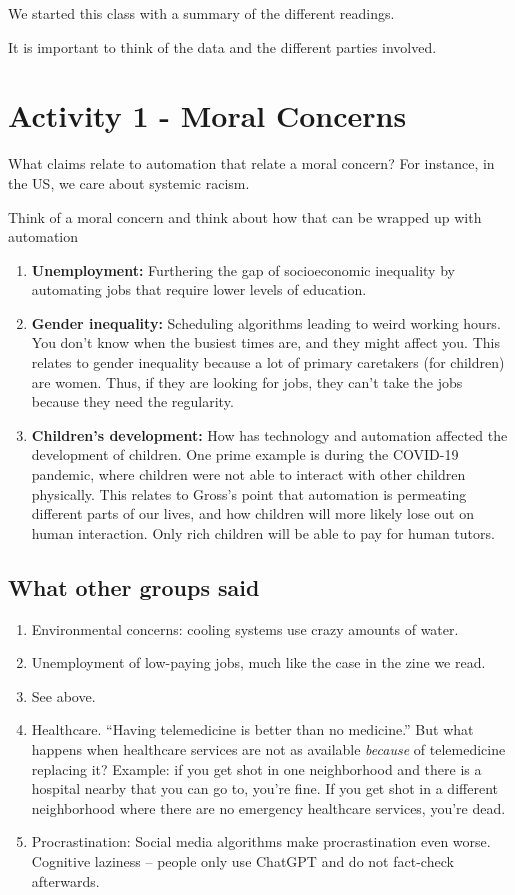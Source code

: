 We started this class with a summary of the different readings.

It is important to think of the data and the different parties involved.

\section{Activity 1 - Moral Concerns}
What claims relate to automation that relate a moral concern?
For instance, in the US, we care about systemic racism.

Think of a moral concern and think about how that can be wrapped up with automation

\begin{enumerate}
    \item \textbf{Unemployment:}
    Furthering the gap of socioeconomic inequality by automating jobs that require lower levels of education.
    \item \textbf{Gender inequality:}
    Scheduling algorithms leading to weird working hours.
    You don't know when the busiest times are, and they might affect you.
    This relates to gender inequality because a lot of primary caretakers (for children) are women.
    Thus, if they are looking for jobs, they can't take the jobs because they need the regularity.
    \item \textbf{Children's development:}
    How has technology and automation affected the development of children.
    One prime example is during the COVID-19 pandemic, where children were not able to interact with other children physically.
    This relates to Gross's point that automation is permeating different parts of our lives, and how children will more likely lose out on human interaction.
    Only rich children will be able to pay for human tutors.
\end{enumerate}

\subsection{What other groups said}

\begin{enumerate}
    \item Environmental concerns: cooling systems use crazy amounts of water.
    \item Unemployment of low-paying jobs, much like the case in the zine we read.
    \item See above.
    \item Healthcare.
    ``Having telemedicine is better than no medicine.''
    But what happens when healthcare services are not as available \textit{because} of telemedicine replacing it?
    Example: if you get shot in one neighborhood and there is a hospital nearby that you can go to, you're fine.
    If you get shot in a different neighborhood where there are no emergency healthcare services, you're dead.
    \item Procrastination:
    Social media algorithms make procrastination even worse.
    Cognitive laziness -- people only use ChatGPT and do not fact-check afterwards.
\end{enumerate}


